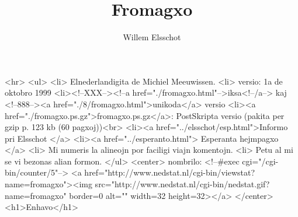 
\title{Fromagxo}
\author{Willem Elsschot}
\date{}

\def\cxapitro#1{\section{#1}}

\def\rrim#1{}
\def\rim#1{}

\def\a#1{(#1)}
\def\ax#1#2{(#2)}



\maketitle
\begin{rawhtml}
<hr>
<ul>
<li> Elnederlandigita de Michiel Meeuwissen.
<li> versio: 1a de oktobro 1999
<li><!--XXX--><!--a href="./fromagxo.html"-->iksa<!--/a-->
 kaj 
   <!--888--><a href="./8/fromagxo.html">unikoda</a> versio
<li><a href="./fromagxo.ps.gz">fromagxo.ps.gz</a>: PostSkripta versio (pakita per gzip p. 123 kb
(60 pagxoj))<br>
<li><a href="../elsschot/esp.html">Informo
pri Elsschot </a>
<li><a href="../esperanto.html"> Esperanta
hejmpagxo </a>
<li> Mi numeris la alineojn por faciligi viajn komentojn. 
<li> Petu al mi se vi bezonas alian formon.
</ul>
<center>
nombrilo: <!--#exec cgi="/cgi-bin/counter/5"-->
<a href="http://www.nedstat.nl/cgi-bin/viewstat?name=fromagxo"><img
src="http://www.nedstat.nl/cgi-bin/nedstat.gif?name=fromagxo" border=0 alt="" 
width=32 height=32></a>
</center>
<h1>Enhavo</h1>
\end{rawhtml}


























